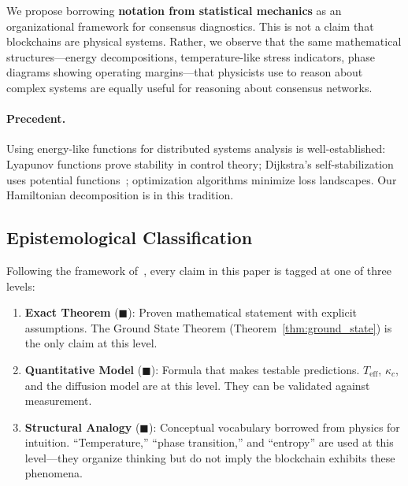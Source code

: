 \documentclass[11pt,a4paper,twocolumn]{article}
\begin{document}
We propose borrowing \textbf{notation from statistical mechanics} as an organizational framework for consensus diagnostics. This is not a claim that blockchains are physical systems. Rather, we observe that the same mathematical structures---energy decompositions, temperature-like stress indicators, phase diagrams showing operating margins---that physicists use to reason about complex systems are equally useful for reasoning about consensus networks.

\paragraph{Precedent.} Using energy-like functions for distributed systems analysis is well-established: Lyapunov functions prove stability in control theory; Dijkstra's self-stabilization uses potential functions~\cite{dijkstra}; optimization algorithms minimize loss landscapes. Our Hamiltonian decomposition is in this tradition.

\subsection{Epistemological Classification}

Following the framework of~\cite{qnk-node-system}, every claim in this paper is tagged at one of three levels:

\begin{enumerate}[nosep]
    \item \textbf{Exact Theorem} (\textcolor{measured}{$\blacksquare$}): Proven mathematical statement with explicit assumptions. The Ground State Theorem (Theorem~\ref{thm:ground_state}) is the only claim at this level.
    \item \textbf{Quantitative Model} (\textcolor{hardcoded}{$\blacksquare$}): Formula that makes testable predictions. $T_{\text{eff}}$, $\kappa_c$, and the diffusion model are at this level. They can be validated against measurement.
    \item \textbf{Structural Analogy} (\textcolor{theoretical}{$\blacksquare$}): Conceptual vocabulary borrowed from physics for intuition. ``Temperature,'' ``phase transition,'' and ``entropy'' are used at this level---they organize thinking but do not imply the blockchain exhibits these phenomena.
\end{enumerate}

\end{document}
